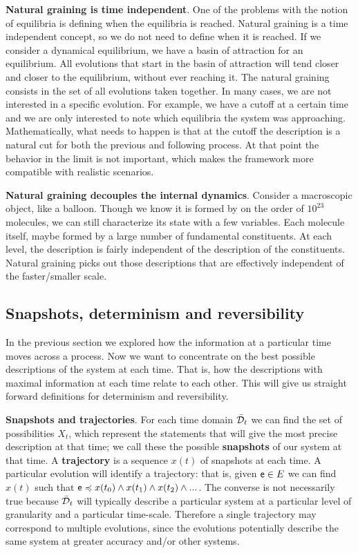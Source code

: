 \documentclass[10pt, onecolumn, longbibliography, nofootinbib]{revtex4-2}
\begin{document}
\textbf{Natural graining is time independent}. One of the problems with the notion of equilibria is defining when the equilibria is reached. Natural graining is a time independent concept, so we do not need to define when it is reached. If we consider a dynamical equilibrium, we have a basin of attraction for an equilibrium. All evolutions that start in the basin of attraction will tend closer and closer to the equilibrium, without ever reaching it. The natural graining consists in the set of all evolutions taken together. In many cases, we are not interested in a specific evolution. For example, we have a cutoff at a certain time and we are only interested to note which equilibria the system was approaching. Mathematically, what needs to happen is that at the cutoff the description is a natural cut for both the previous and following process. At that point the behavior in the limit is not important, which makes the framework more compatible with realistic scenarios.

\textbf{Natural graining decouples the internal dynamics}. Consider a macroscopic object, like a balloon. Though we know it is formed by on the order of $10^23$ molecules, we can still characterize its state with a few variables. Each molecule itself, maybe formed by a large number of fundamental constituents. At each level, the description is fairly independent of the description of the constituents. Natural graining picks out those descriptions that are effectively independent of the faster/smaller scale.


\subsection{Snapshots, determinism and reversibility}

In the previous section we explored how the information at a particular time moves across a process. Now we want to concentrate on the best possible descriptions of the system at each time. That is, how the descriptions with maximal information at each time relate to each other. This will give us straight forward definitions for determinism and reversibility.

\textbf{Snapshots and trajectories}. For each time domain $\tdomain_t$ we can find the set of possibilities $X_t$, which represent the statements that will give the most precise description at that time; we call these the possible \textbf{snapshots} of our system at that time. A \textbf{trajectory} is a sequence $x(t)$ of snapshots at each time. A particular evolution will identify a trajectory: that is, given $\stmt[e] \in E$ we can find $x(t)$ such that $\stmt[e] \narrower x(t_0) \AND x(t_1) \AND x(t_2) \AND ... $. The converse is not necessarily true because $\tdomain_t$ will typically describe a particular system at a particular level of granularity and a particular time-scale. Therefore a single trajectory may correspond to multiple evolutions, since the evolutions potentially describe the same system at greater accuracy and/or other systems.
\end{document}
